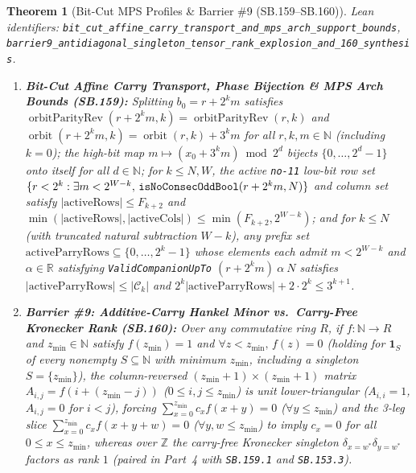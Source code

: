 \documentclass[11pt]{article}
\newtheorem{theorem}{Theorem}[section]
\begin{document}
\begin{theorem}[Bit-Cut MPS Profiles \& Barrier \#9 (SB.159--SB.160)]
\emph{Lean identifiers:} \nolinkurl{bit_cut_affine_carry_transport_and_mps_arch_support_bounds}, \nolinkurl{barrier9_antidiagonal_singleton_tensor_rank_explosion_and_160_synthesis}.
\begin{enumerate}
  \item \textbf{Bit-Cut Affine Carry Transport, Phase Bijection \& MPS Arch Bounds (SB.159):} Splitting $b_0 = r + 2^k m$ satisfies $\operatorname{orbitParityRev}(r + 2^k m, k) = \operatorname{orbitParityRev}(r, k)$ and $\operatorname{orbit}(r + 2^k m, k) = \operatorname{orbit}(r, k) + 3^k m$ for all $r, k, m \in \mathbb{N}$ (including $k = 0$); the high-bit map $m \mapsto (x_0 + 3^k m) \bmod 2^d$ bijects $\{0,\dots,2^d-1\}$ onto itself for all $d \in \mathbb{N}$; for $k \le N, W$, the active \texttt{no-11} low-bit row set $\{r < 2^k : \exists m < 2^{W-k},\, \text{\texttt{isNoConsecOddBool}}(r + 2^k m, N)\}$ and column set satisfy $|\text{activeRows}| \le F_{k+2}$ and $\min(|\text{activeRows}|, |\text{activeCols}|) \le \min(F_{k+2}, 2^{W-k})$; and for $k \le N$ (with truncated natural subtraction $W - k$), any prefix set $\text{activeParryRows} \subseteq \{0,\dots,2^k-1\}$ whose elements each admit $m < 2^{W-k}$ and $\alpha \in \mathbb{R}$ satisfying \texttt{ValidCompanionUpTo} $(r + 2^k m)\ \alpha\ N$ satisfies $|\text{activeParryRows}| \le |\mathcal{C}_k|$ and $2^k |\text{activeParryRows}| + 2 \cdot 2^k \le 3^{k+1}$.
  \item \textbf{Barrier \#9: Additive-Carry Hankel Minor vs.\ Carry-Free Kronecker Rank (SB.160):} Over any commutative ring $R$, if $f : \mathbb{N} \to R$ and $z_{\min} \in \mathbb{N}$ satisfy $f(z_{\min}) = 1$ and $\forall z < z_{\min},\, f(z) = 0$ (holding for $\mathbf{1}_S$ of every nonempty $S \subseteq \mathbb{N}$ with minimum $z_{\min}$, including a singleton $S = \{z_{\min}\}$), the column-reversed $(z_{\min}+1) \times (z_{\min}+1)$ matrix $A_{i,j} = f(i + (z_{\min} - j))$ ($0 \le i, j \le z_{\min}$) is unit lower-triangular ($A_{i,i} = 1$, $A_{i,j} = 0$ for $i < j$), forcing $\sum_{x=0}^{z_{\min}} c_x f(x + y) = 0$ ($\forall y \le z_{\min}$) and the 3-leg slice $\sum_{x=0}^{z_{\min}} c_x f(x + y + w) = 0$ ($\forall y, w \le z_{\min}$) to imply $c_x = 0$ for all $0 \le x \le z_{\min}$, whereas over $\mathbb{Z}$ the carry-free Kronecker singleton $\delta_{x=w^*}\delta_{y=w^*}$ factors as rank $1$ (paired in Part~4 with \texttt{SB.159.1} and \texttt{SB.153.3}).
\end{enumerate}
\end{theorem}
\end{document}
